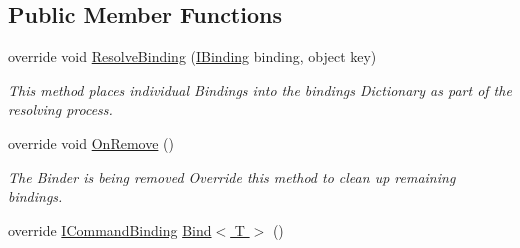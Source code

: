 \subsection*{Public Member Functions}
\begin{DoxyCompactItemize}
\item 
override void \hyperlink{classstrange_1_1extensions_1_1command_1_1impl_1_1_signal_command_binder_a8968e1632b03d1f9223f8e66e721327f}{Resolve\-Binding} (\hyperlink{interfacestrange_1_1framework_1_1api_1_1_i_binding}{I\-Binding} binding, object key)
\begin{DoxyCompactList}\small\item\em This method places individual Bindings into the bindings Dictionary as part of the resolving process. \end{DoxyCompactList}\item 
\hypertarget{classstrange_1_1extensions_1_1command_1_1impl_1_1_signal_command_binder_ab901d2f3ce792135ba5e1ea15c2ea7d6}{override void \hyperlink{classstrange_1_1extensions_1_1command_1_1impl_1_1_signal_command_binder_ab901d2f3ce792135ba5e1ea15c2ea7d6}{On\-Remove} ()}\label{classstrange_1_1extensions_1_1command_1_1impl_1_1_signal_command_binder_ab901d2f3ce792135ba5e1ea15c2ea7d6}

\begin{DoxyCompactList}\small\item\em The Binder is being removed Override this method to clean up remaining bindings. \end{DoxyCompactList}\item 
\hypertarget{classstrange_1_1extensions_1_1command_1_1impl_1_1_signal_command_binder_ac80ab27639b330cbbfaea137328ba032}{override \hyperlink{interfacestrange_1_1extensions_1_1command_1_1api_1_1_i_command_binding}{I\-Command\-Binding} \hyperlink{classstrange_1_1extensions_1_1command_1_1impl_1_1_signal_command_binder_ac80ab27639b330cbbfaea137328ba032}{Bind$<$ T $>$} ()}\label{classstrange_1_1extensions_1_1command_1_1impl_1_1_signal_command_binder_ac80ab27639b330cbbfaea137328ba032}


\end{DoxyCompactItemize}
